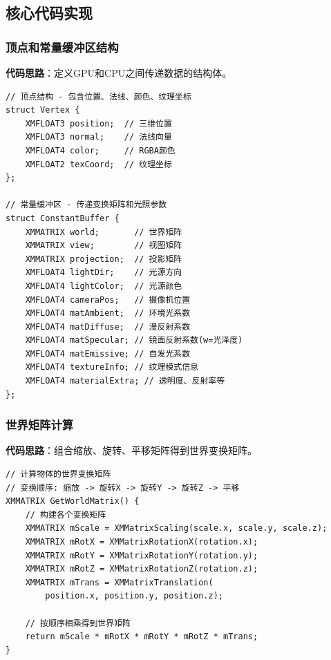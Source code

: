\documentclass[12pt,a4paper]{article}
\begin{document}
\begin{tcolorbox}
\subsection{核心代码实现}

\subsubsection{顶点和常量缓冲区结构}

\textbf{代码思路}：定义GPU和CPU之间传递数据的结构体。

\begin{lstlisting}[caption={顶点和常量缓冲区结构定义}]
// 顶点结构 - 包含位置、法线、颜色、纹理坐标
struct Vertex {
    XMFLOAT3 position;  // 三维位置
    XMFLOAT3 normal;    // 法线向量
    XMFLOAT4 color;     // RGBA颜色
    XMFLOAT2 texCoord;  // 纹理坐标
};

// 常量缓冲区 - 传递变换矩阵和光照参数
struct ConstantBuffer {
    XMMATRIX world;       // 世界矩阵
    XMMATRIX view;        // 视图矩阵
    XMMATRIX projection;  // 投影矩阵
    XMFLOAT4 lightDir;    // 光源方向
    XMFLOAT4 lightColor;  // 光源颜色
    XMFLOAT4 cameraPos;   // 摄像机位置
    XMFLOAT4 matAmbient;  // 环境光系数
    XMFLOAT4 matDiffuse;  // 漫反射系数
    XMFLOAT4 matSpecular; // 镜面反射系数(w=光泽度)
    XMFLOAT4 matEmissive; // 自发光系数
    XMFLOAT4 textureInfo; // 纹理模式信息
    XMFLOAT4 materialExtra; // 透明度、反射率等
};
\end{lstlisting}

\subsubsection{世界矩阵计算}

\textbf{代码思路}：组合缩放、旋转、平移矩阵得到世界变换矩阵。

\begin{lstlisting}[caption={世界矩阵计算函数}]
// 计算物体的世界变换矩阵
// 变换顺序: 缩放 -> 旋转X -> 旋转Y -> 旋转Z -> 平移
XMMATRIX GetWorldMatrix() {
    // 构建各个变换矩阵
    XMMATRIX mScale = XMMatrixScaling(scale.x, scale.y, scale.z);
    XMMATRIX mRotX = XMMatrixRotationX(rotation.x);
    XMMATRIX mRotY = XMMatrixRotationY(rotation.y);
    XMMATRIX mRotZ = XMMatrixRotationZ(rotation.z);
    XMMATRIX mTrans = XMMatrixTranslation(
        position.x, position.y, position.z);
    
    // 按顺序相乘得到世界矩阵
    return mScale * mRotX * mRotY * mRotZ * mTrans;
}
\end{lstlisting}
\end{tcolorbox}
\end{document}

